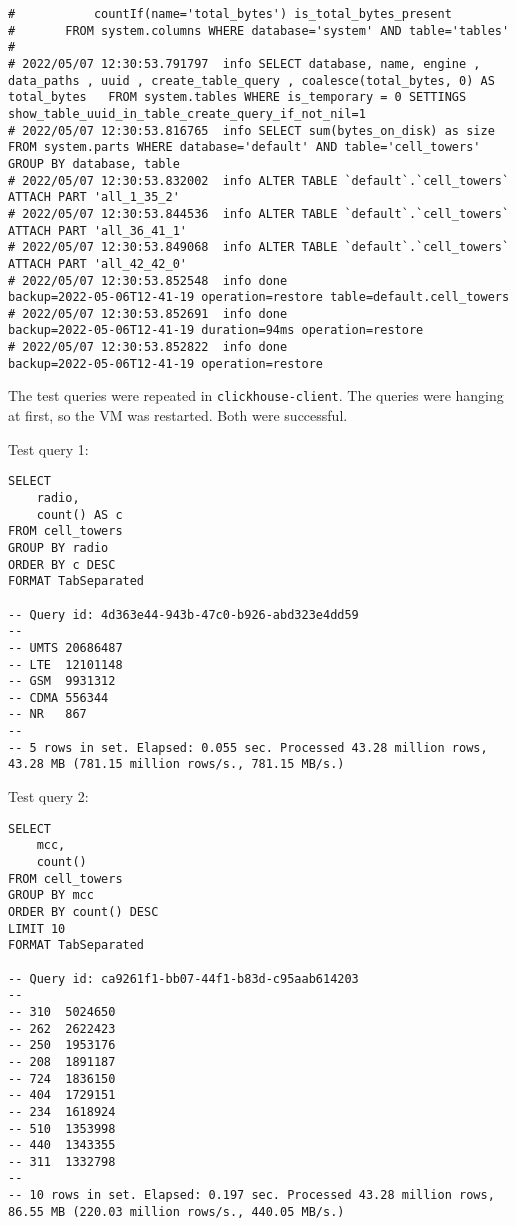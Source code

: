 \begin{verbatim}
# 			countIf(name='total_bytes') is_total_bytes_present
# 		FROM system.columns WHERE database='system' AND table='tables'
#
# 2022/05/07 12:30:53.791797  info SELECT database, name, engine , data_paths , uuid , create_table_query , coalesce(total_bytes, 0) AS total_bytes   FROM system.tables WHERE is_temporary = 0 SETTINGS show_table_uuid_in_table_create_query_if_not_nil=1
# 2022/05/07 12:30:53.816765  info SELECT sum(bytes_on_disk) as size FROM system.parts WHERE database='default' AND table='cell_towers' GROUP BY database, table
# 2022/05/07 12:30:53.832002  info ALTER TABLE `default`.`cell_towers` ATTACH PART 'all_1_35_2'
# 2022/05/07 12:30:53.844536  info ALTER TABLE `default`.`cell_towers` ATTACH PART 'all_36_41_1'
# 2022/05/07 12:30:53.849068  info ALTER TABLE `default`.`cell_towers` ATTACH PART 'all_42_42_0'
# 2022/05/07 12:30:53.852548  info done                      backup=2022-05-06T12-41-19 operation=restore table=default.cell_towers
# 2022/05/07 12:30:53.852691  info done                      backup=2022-05-06T12-41-19 duration=94ms operation=restore
# 2022/05/07 12:30:53.852822  info done                      backup=2022-05-06T12-41-19 operation=restore
\end{verbatim}

The test queries were repeated in \texttt{clickhouse-client}.
The queries were hanging at first, so the VM was restarted.
Both were successful.

Test query 1:
\begin{verbatim}
SELECT
    radio,
    count() AS c
FROM cell_towers
GROUP BY radio
ORDER BY c DESC
FORMAT TabSeparated

-- Query id: 4d363e44-943b-47c0-b926-abd323e4dd59
--
-- UMTS	20686487
-- LTE	12101148
-- GSM	9931312
-- CDMA	556344
-- NR	867
--
-- 5 rows in set. Elapsed: 0.055 sec. Processed 43.28 million rows, 43.28 MB (781.15 million rows/s., 781.15 MB/s.)
\end{verbatim}

Test query 2:
\begin{verbatim}
SELECT
    mcc,
    count()
FROM cell_towers
GROUP BY mcc
ORDER BY count() DESC
LIMIT 10
FORMAT TabSeparated

-- Query id: ca9261f1-bb07-44f1-b83d-c95aab614203
--
-- 310	5024650
-- 262	2622423
-- 250	1953176
-- 208	1891187
-- 724	1836150
-- 404	1729151
-- 234	1618924
-- 510	1353998
-- 440	1343355
-- 311	1332798
--
-- 10 rows in set. Elapsed: 0.197 sec. Processed 43.28 million rows, 86.55 MB (220.03 million rows/s., 440.05 MB/s.)
\end{verbatim}
